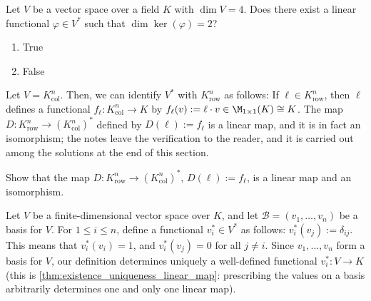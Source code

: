\begin{exercise}
\label{exc:dim_kernel_linear_functional_sc}
Let $V$ be a vector space over a field $K$ with $\dim V = 4$. Does there exist a linear functional $\varphi \in V^*$ such that $\dim \ker(\varphi) = 2$?
\begin{enumerate}
    \item True
    \item False
\end{enumerate}
\end{exercise}

Let $V = K_{\text{col}}^n$. Then, we can identify $V^*$ with $K_{\text{row}}^n$ as follows: If $\ell \in K_{\text{row}}^n$, then $\ell$ defines a functional $f_{\ell} \colon K_{\text{col}}^n \to K$ by $f_{\ell}(v) := \ell \cdot v \in \M_{1 \times 1}(K) \cong K$. %
The map $D \colon K_{\text{row}}^n \to (K_{\text{col}}^n)^*$ defined by $D(\ell) := f_{\ell}$ is a linear map, and it is in fact an isomorphism; the notes leave the verification to the reader, and it is carried out among the solutions at the end of this section.

\begin{exercise}
\label{exc:row_space_is_dual}
Show that the map $D \colon K_{\text{row}}^n \to (K_{\text{col}}^n)^*$, $D(\ell) := f_{\ell}$, is a linear map and an isomorphism.
\end{exercise}


\begin{definition*}
\label{def:dual_basis_functionals}
Let $V$ be a finite-di\-men\-sional vector space over $K$, and let $\mathcal{B} = (v_1, \dots, v_n)$ be a basis for $V$. For $1 \leq i \leq n$, define a functional $v_i^* \in V^*$ as follows: $v_i^*(v_j) := \delta_{ij}$. This means that $v_i^*(v_i) = 1$, and $v_i^*(v_j) = 0$ for all $j \neq i$. Since $v_1, \dots, v_n$ form a basis for $V$, our definition determines uniquely a well-defined functional $v_i^* \colon V \to K$
(this is \cref{thm:existence_uniqueness_linear_map}: prescribing the values on a basis arbitrarily determines one and only one linear map).
\end{definition*}

